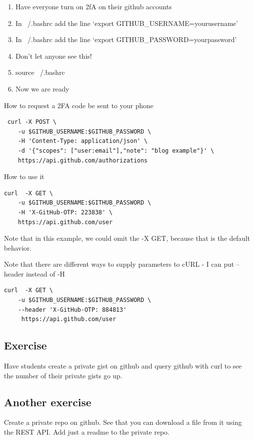 \documentclass[10pt]{article}
\begin{document}
\begin{enumerate}
\item Have everyone turn on 2fA on their github accounts
\item In ~/.bashrc add the line `export GITHUB\_USERNAME=yourusername'
\item In ~/.bashrc add the line `export GITHUB\_PASSWORD=yourpassword'
\item Don't let anyone see this!
\item source ~/.bashrc
\item Now we are ready
\end{enumerate}

How to request a 2FA code be sent to your phone
\begin{lstlisting}
 curl -X POST \
	-u $GITHUB_USERNAME:$GITHUB_PASSWORD \
	-H 'Content-Type: application/json' \
	-d '{"scopes": ["user:email"],"note": "blog example"}' \
	https://api.github.com/authorizations
\end{lstlisting}

How to use it
\begin{lstlisting}
curl  -X GET \
	-u $GITHUB_USERNAME:$GITHUB_PASSWORD \
	-H 'X-GitHub-OTP: 223838' \
	https://api.github.com/user
\end{lstlisting}


Note that in this example, we could omit the -X GET, because that is the default behavior.

Note that there are different ways to supply parameters to cURL - I can put --header instead of -H

\begin{lstlisting}
curl  -X GET \
	-u $GITHUB_USERNAME:$GITHUB_PASSWORD \
	--header 'X-GitHub-OTP: 884813'
	 https://api.github.com/user
\end{lstlisting}

\subsection{Exercise}
Have students create a private gist on github and query github with curl to see the number of their private gists go up.

\subsection{Another exercise}
Create a private repo on github. See that you can download a file from it using the REST API. Add just a readme to the private repo.
\end{document}
